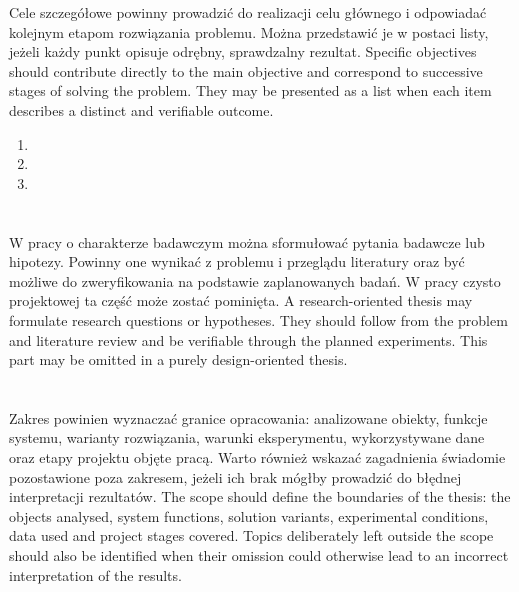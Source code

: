 \ploren
  {Cele szczegółowe powinny prowadzić do realizacji celu głównego i odpowiadać kolejnym etapom rozwiązania problemu. Można przedstawić je w postaci listy, jeżeli każdy punkt opisuje odrębny, sprawdzalny rezultat.}
  {Specific objectives should contribute directly to the main objective and correspond to successive stages of solving the problem. They may be presented as a list when each item describes a distinct and verifiable outcome.}

\begin{enumerate}
  \item {}
  \item {}
  \item {}
\end{enumerate}

\section{}

\ploren
  {W pracy o charakterze badawczym można sformułować pytania badawcze lub hipotezy. Powinny one wynikać z problemu i przeglądu literatury oraz być możliwe do zweryfikowania na podstawie zaplanowanych badań. W pracy czysto projektowej ta część może zostać pominięta.}
  {A research-oriented thesis may formulate research questions or hypotheses. They should follow from the problem and literature review and be verifiable through the planned experiments. This part may be omitted in a purely design-oriented thesis.}

\section{}

\ploren
  {Zakres powinien wyznaczać granice opracowania: analizowane obiekty, funkcje systemu, warianty rozwiązania, warunki eksperymentu, wykorzystywane dane oraz etapy projektu objęte pracą. Warto również wskazać zagadnienia świadomie pozostawione poza zakresem, jeżeli ich brak mógłby prowadzić do błędnej interpretacji rezultatów.}
  {The scope should define the boundaries of the thesis: the objects analysed, system functions, solution variants, experimental conditions, data used and project stages covered. Topics deliberately left outside the scope should also be identified when their omission could otherwise lead to an incorrect interpretation of the results.}

